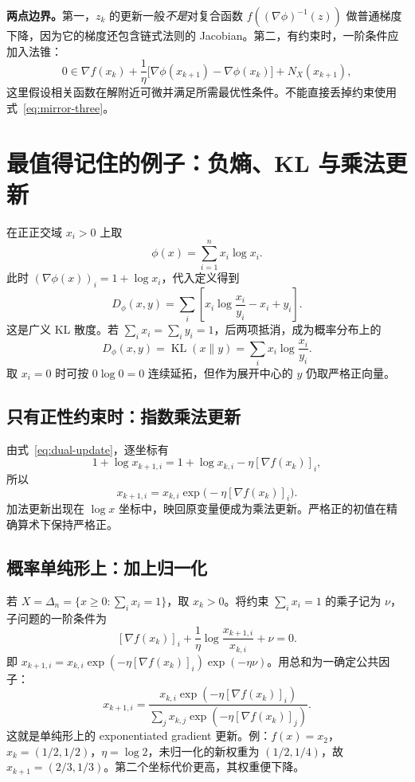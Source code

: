 \documentclass[11pt,a4paper]{ctexart}
\newcommand{\KL}{\operatorname{KL}}
\begin{document}
\textbf{两点边界。}第一，$z_k$ 的更新一般\emph{不是}对复合函数 $f((\nabla\phi)^{-1}(z))$ 做普通梯度下降，因为它的梯度还包含链式法则的 Jacobian。第二，有约束时，一阶条件应加入法锥：
\[
0\in\nabla f(x_k)+\frac1\eta\bigl[\nabla\phi(x_{k+1})-\nabla\phi(x_k)\bigr]+N_X(x_{k+1}),
\]
这里假设相关函数在解附近可微并满足所需最优性条件。不能直接丢掉约束使用式~\eqref{eq:mirror-three}。

\section{最值得记住的例子：负熵、KL 与乘法更新}
在正正交域 $x_i>0$ 上取
\begin{equation}\label{eq:entropy}
\phi(x)=\sum_{i=1}^n x_i\log x_i.
\end{equation}
此时 $(\nabla\phi(x))_i=1+\log x_i$，代入定义得到
\begin{equation}\label{eq:gen-kl}
D_\phi(x,y)=\sum_i\left[x_i\log\frac{x_i}{y_i}-x_i+y_i\right].
\end{equation}
这是广义 KL 散度。若 $\sum_i x_i=\sum_i y_i=1$，后两项抵消，成为概率分布上的
\[
D_\phi(x,y)=\KL(x\|y)=\sum_i x_i\log\frac{x_i}{y_i}.
\]
取 $x_i=0$ 时可按 $0\log0=0$ 连续延拓，但作为展开中心的 $y$ 仍取严格正向量。

\subsection{只有正性约束时：指数乘法更新}
由式~\eqref{eq:dual-update}，逐坐标有
\[
1+\log x_{k+1,i}=1+\log x_{k,i}-\eta[\nabla f(x_k)]_i,
\]
所以
\begin{equation}\label{eq:multiplicative}
\boxed{x_{k+1,i}=x_{k,i}\exp\bigl(-\eta[\nabla f(x_k)]_i\bigr).}
\end{equation}
加法更新出现在 $\log x$ 坐标中，映回原变量便成为乘法更新。严格正的初值在精确算术下保持严格正。

\subsection{概率单纯形上：加上归一化}
若 $X=\Delta_n=\{x\geq0:\sum_i x_i=1\}$，取 $x_k>0$。将约束 $\sum_i x_i=1$ 的乘子记为 $\nu$，子问题的一阶条件为
\[
[\nabla f(x_k)]_i+\frac1\eta\log\frac{x_{k+1,i}}{x_{k,i}}+\nu=0.
\]
即 $x_{k+1,i}=x_{k,i}\exp(-\eta[\nabla f(x_k)]_i)\exp(-\eta\nu)$。用总和为一确定公共因子：
\begin{equation}\label{eq:simplex}
\boxed{x_{k+1,i}=\frac{x_{k,i}\exp(-\eta[\nabla f(x_k)]_i)}
{\sum_jx_{k,j}\exp(-\eta[\nabla f(x_k)]_j)}.}
\end{equation}
这就是单纯形上的 exponentiated gradient 更新。例：$f(x)=x_2$，$x_k=(1/2,1/2)$，$\eta=\log2$，未归一化的新权重为 $(1/2,1/4)$，故 $x_{k+1}=(2/3,1/3)$。第二个坐标代价更高，其权重便下降。
\end{document}
